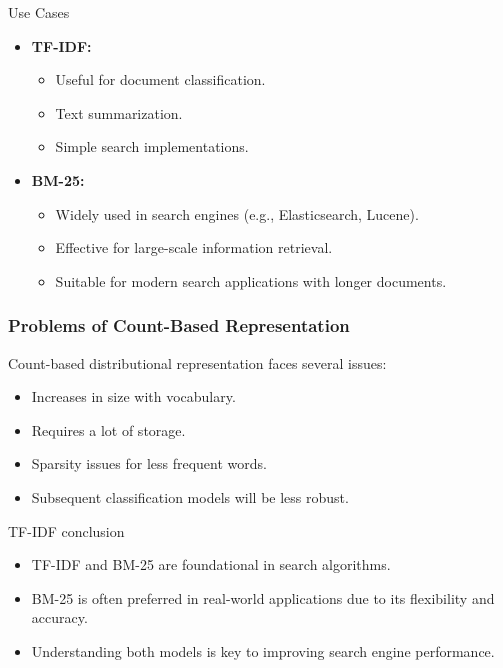 \documentclass{beamer}
\begin{document}
\begin{frame}{Use Cases}
    \begin{itemize}
        \item \textbf{TF-IDF:}
        \begin{itemize}
            \item Useful for document classification.
            \item Text summarization.
            \item Simple search implementations.
        \end{itemize}
        \item \textbf{BM-25:}
        \begin{itemize}
            \item Widely used in search engines (e.g., Elasticsearch, Lucene).
            \item Effective for large-scale information retrieval.
            \item Suitable for modern search applications with longer documents.
        \end{itemize}
    \end{itemize}
\end{frame}

\begin{frame}
\frametitle{Problems of Count-Based Representation}
Count-based distributional representation faces several issues:
\begin{itemize}
    \item Increases in size with vocabulary.
    \item Requires a lot of storage.
    \item Sparsity issues for less frequent words.
    \item Subsequent classification models will be less robust.
\end{itemize}
\end{frame}

\begin{frame}{TF-IDF conclusion}
    \begin{itemize}
        \item TF-IDF and BM-25 are foundational in search algorithms.
        \item BM-25 is often preferred in real-world applications due to its flexibility and accuracy.
        \item Understanding both models is key to improving search engine performance.
    \end{itemize}
\end{frame}
\end{document}
